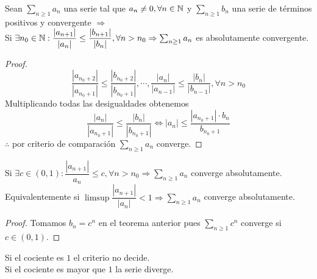 \begin{theorem}
  Sean $\sum_{n \geq 1} a_n$ una serie tal que $a_n \neq 0, \forall n \in \mathbb{N}$ y $\sum_{n \geq 1} b_n$ una serie de términos positivos y convergente $\Rightarrow$ \\
  Si $\exists n_0 \in \mathbb{N} : \dfrac{|a_{n+1}|}{|a_n|} \leq \dfrac{|b_{n+1}|}{|b_n|}, \forall n > n_0 \Rightarrow \sum_{n \geq 1} a_n$ es absolutamente convergente.

  \begin{proof}
    \begin{equation}
      \dfrac{|a_{n_0 + 2}|}{|a_{n_0 + 1}|} \leq \dfrac{|b_{n_0+2}|}{|b_{n_0+1}|}, \cdots, \dfrac{|a_n|}{|a_{n-1}|} \leq \dfrac{|b_n|}{|b_{n-1}|}, \forall n > n_0
    \end{equation}
    Multiplicando todas las desigualdades obtenemos
    \begin{equation}
      \dfrac{|a_n|}{|a_{n_0+1}|} \leq \dfrac{|b_n|}{|b_{n_0+1}|} \iff |a_n| \leq \dfrac{|a_{n_0+1}| \cdot b_n}{b_{n_0+1}}
    \end{equation}
    $\therefore$ por criterio de comparación $\sum_{n \geq 1} a_n$ converge.
  \end{proof}
\end{theorem}

\begin{corollary}
  Si $\exists c \in (0, 1) : \dfrac{|a_{n+1}|}{a_n} \leq c, \forall n > n_0 \Rightarrow \sum_{n \geq 1} a_n$ converge absolutamente. \\
  Equivalentemente si $\limsup \dfrac{|a_{n+1}|}{|a_n|} < 1 \Rightarrow \sum_{n \geq 1} a_n$ converge absolutamente.

  \begin{proof}
    Tomamos $b_n = c^n$ en el teorema anterior pues $\sum_{n \geq 1} c^n$ converge si $c \in (0 ,1)$.
  \end{proof}
\end{corollary}

\begin{note}
  Si el cociente es $1$ el criterio no decide. \\
  Si el cociente es mayor que $1$ la serie diverge.
\end{note}

